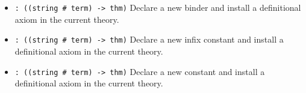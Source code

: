 \documentclass[12pt]{article}
\begin{document}
\begin{itemize}
\item {} \verb|: ((string # term) -> thm)|\newline
Declare a new binder and install a definitional axiom in the current theory.

\item {} \verb|: ((string # term) -> thm)|\newline
Declare a new infix constant and install a definitional axiom in the current theory.

\item {} \verb|: ((string # term) -> thm)|\newline
Declare a new constant and install a definitional axiom in the current theory.
\end{itemize}
\end{document}
